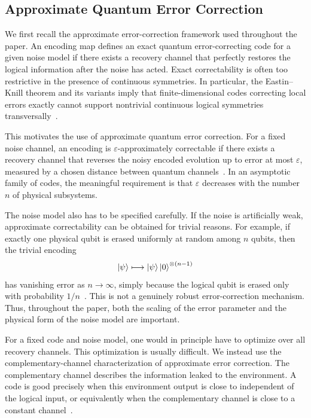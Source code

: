 \documentclass[10pt,twocolumn,superscriptaddress,aps,amsmath,amssymb,citeautoscript,floatfix,prx,longbibliography]{revtex4-2}
\theoremstyle{plain}
\theoremstyle{plain}
\theoremstyle{plain}
\theoremstyle{plain}
\theoremstyle{plain}
\theoremstyle{plain}
\begin{document}
\subsection{Approximate Quantum Error Correction}\label{subsec:main_AQEC}

We first recall the approximate error-correction framework used throughout the paper. An encoding map defines an exact quantum error-correcting code for a given noise model if there exists a recovery channel that perfectly restores the logical information after the noise has acted. Exact correctability is often too restrictive in the presence of continuous symmetries. In particular, the Eastin--Knill theorem and its variants imply that finite-dimensional codes correcting local errors exactly cannot support nontrivial continuous logical symmetries transversally~\cite{Eastin2009}.

This motivates the use of approximate quantum error correction. For a fixed noise channel, an encoding is $\varepsilon$-approximately correctable if there exists a recovery channel that reverses the noisy encoded evolution up to error at most $\varepsilon$, measured by a chosen distance between quantum channels~\cite{Beny2010}. In an asymptotic family of codes, the meaningful requirement is that $\varepsilon$ decreases with the number $n$ of physical subsystems.

The noise model also has to be specified carefully. If the noise is artificially weak, approximate correctability can be obtained for trivial reasons. For example, if exactly one physical qubit is erased uniformly at random among $n$ qubits, then the trivial encoding
$$
    \ket\psi
    \longmapsto
    \ket\psi\ket 0^{\otimes(n-1)}
$$
has vanishing error as $n\to\infty$, simply because the logical qubit is erased only with probability $1/n$~\cite{Yi2024}. This is not a genuinely robust error-correction mechanism. Thus, throughout the paper, both the scaling of the error parameter and the physical form of the noise model are important.

For a fixed code and noise model, one would in principle have to optimize over all recovery channels. This optimization is usually difficult. We instead use the complementary-channel characterization of approximate error correction. The complementary channel describes the information leaked to the environment. A code is good precisely when this environment output is close to independent of the logical input, or equivalently when the complementary channel is close to a constant channel~\cite{Beny2010, Faist2020}.
\end{document}
